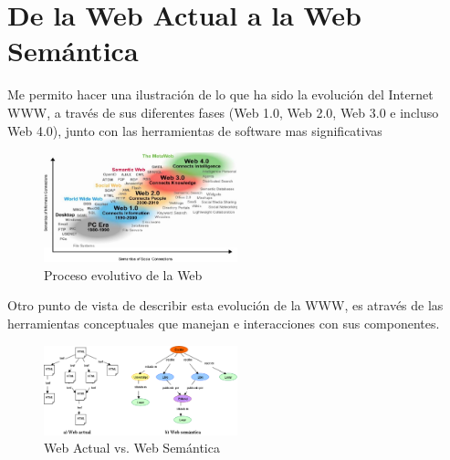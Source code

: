 \documentclass[conference]{IEEEtran}
\begin{document}
\section{De la Web Actual a la Web Semántica}
   Me permito hacer una ilustración de lo que ha sido la evolución del Internet WWW, a través de sus diferentes fases (Web 1.0, Web 2.0, Web 3.0 e incluso Web 4.0), junto con las herramientas de software mas significativas
   \begin{figure}[h]
   	\centering
   	\includegraphics[width=0.5\textwidth]{ws-evolucion-proy}
   	\caption{Proceso evolutivo de la Web}
   \end{figure}
   Otro punto de vista de describir esta evolución de la WWW, es através de las herramientas conceptuales que manejan e interacciones con sus componentes.
   \begin{figure}[h]
   	\centering
   	\includegraphics[width=0.5\textwidth]{ws-actual-ws2}
   	\caption{Web Actual vs. Web Semántica}
   \end{figure}
   
   
\end{document}
